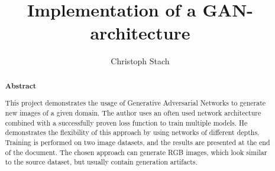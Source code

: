 \documentclass{scrartcl}
\title{Implementation of a GAN-architecture}
\author{Christoph Stach}
\begin{document}
\maketitle

\newpage

\begin{abstract}
    \thispagestyle{empty}
    \begin{changemargin}{2.0cm}{2.0cm}
        
        \vspace*{\fill}
        \begin{center}
            \Large
            \textbf{Abstract}
            \vspace{0.5cm}
        \end{center}

        \large
        This project demonstrates the usage of Generative Adversarial Networks to generate new images of a given domain. The author uses an often used network architecture combined with a successfully proven loss function to train multiple models. He demonstrates the flexibility of this approach by using networks of different depths. Training is performed on two image datasets, and the results are presented at the end of the document. The chosen approach can generate RGB images, which look similar to the source dataset, but usually contain generation artifacts. 

        \vspace*{\fill}
    \end{changemargin}
\end{abstract}

\newpage



\thispagestyle{empty}
\tableofcontents


\newpage
\thispagestyle{empty}

\listoffigures
{}
\listoftables

\lstlistoflistings


\newpage



 \newpage
 \newpage
 \newpage
 \newpage

\end{document}
